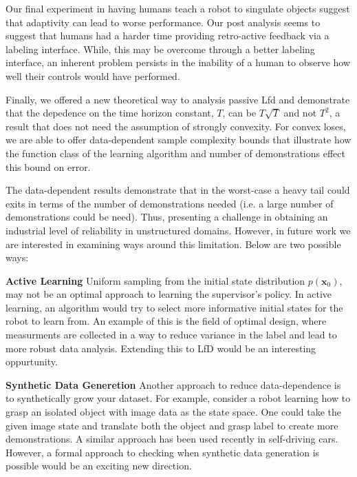 \documentclass[10pt, conference]{ieeeconf}      %
\newcommand{\bx}{\mathbf{x}}
\begin{document}
Our final experiment in having humans teach a robot to singulate objects suggest that adaptivity can lead to worse performance. Our post analysis seems to suggest that humans had a harder time providing retro-active feedback via a labeling interface. While, this may be overcome through a better labeling interface, an inherent problem persists in the inability of a human to observe how well their controls would have performed. 

Finally, we offered a new theoretical  way to analysis passive Lfd and demonstrate that the depedence on the time horizon constant, $T$, can be $T\sqrt{T}$ and not $T^2$, a result that does not need the assumption of strongly convexity.  For convex loses, we are able to offer data-dependent sample complexity bounds that illustrate how the function class of the learning algorithm and number of demonstrations effect this bound on error. 

The data-dependent results demonstrate that in the worst-case a heavy tail could exits in terms of the number of demonstrations needed (i.e. a large number of demonstrations could be need). Thus, presenting a challenge in obtaining an industrial level of reliability in unstructured domains. However, in future work we are interested in examining ways around this limitation. Below are two possible ways:

\noindent \textbf{Active Learning} Uniform sampling from the initial state distribution $p(\bx_0)$, may not be an optimal approach to learning the supervisor's policy. In active learning, an algorithm would try to select more informative initial states for the robot to learn from. An example of this is the field of optimal design, where measurments are collected in a way to reduce variance in the label and lead to more robust data analysis. Extending this to LfD would be an interesting oppurtunity. 

\noindent \textbf{Synthetic Data Generetion} Another approach to reduce data-dependence is to synthetically grow your dataset. For example, consider a robot learning how to grasp an isolated object  with image data as the state space. One could take the given image state and translate both the object and grasp label to create more demonstrations. A similar approach has been used recently in self-driving cars. However, a formal approach to checking when synthetic data generation is possible would be an exciting new direction. 



\end{document}

